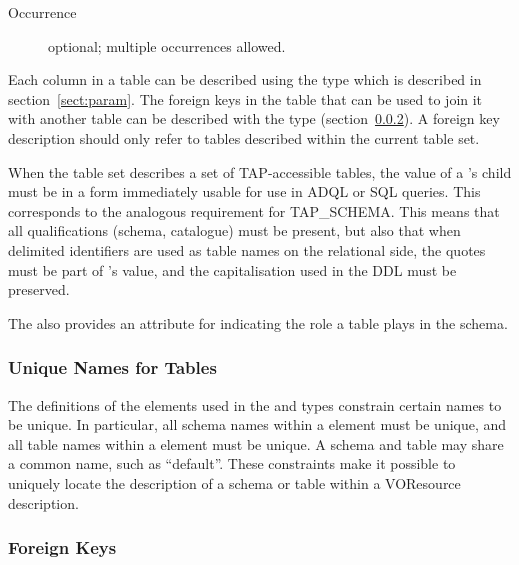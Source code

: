 \documentclass[11pt,a4paper]{ivoa}
\newcommand{\tapschema}{TAP\_SCHE\-MA}
\newcommand{\tapschema}{\mbox{%
  TAP\discretionary{-}{}{\kern-2pt\_}SCHEMA}}
\begin{document}
\begin{generated}
\begin{bigdescription}
\begin{description}
\item[Occurrence] optional; multiple occurrences allowed.

\end{description}


\end{bigdescription}\endgroup

\endgroup
\end{generated}





Each column in a table can be described using the
 type which is described in
section~\ref{sect:param}.  The foreign keys in the table that
can be used to join it with another table can be described with the
 type (section~\ref{sect:fkey}).
A foreign key description should only refer to tables described within
the current table set.  

When the table set describes a set of TAP-accessible tables, the value of
a 's  child must be in a form immediately
usable for use in ADQL or SQL queries. This corresponds to the analogous
requirement for \tapschema.  This means that all qualifications (schema,
catalogue) must be present, but also that when delimited
identifiers are used as table names on the relational side,
the quotes must be part of 's value, and the
capitalisation used in the DDL must be preserved.


The  also provides an attribute for indicating
the role a table plays in the schema.





\subsubsection{Unique Names for Tables}
\label{sect:unique}


The definitions of the  elements used in
the  and
 types
constrain certain names to be unique.  In particular, all schema names
within a  element must be unique, and all
table names within a  element must be
unique.  A schema and table may share a common name, such as
``default''.  These constraints make it possible to uniquely locate
the description of a schema or table within a VOResource description.  


\subsubsection{Foreign Keys}
\label{sect:fkey}
\end{document}
